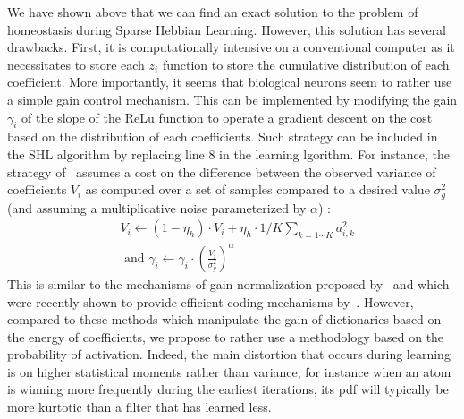 \documentclass[letterpaper,final,conference,10pt]{IEEEtran}
\newcommand{\citep}[1]{\cite{#1}}
\newcommand{\seeFig}[1]{Figure~\ref{fig:#1}}%
\begin{document}
We have shown above that we can find an exact solution to the problem of homeostasis during Sparse Hebbian Learning. However, this solution has several drawbacks. First, it is computationally intensive on a conventional computer as it necessitates to store each $z_i$ function to store the cumulative distribution of each coefficient. More importantly, it seems that biological neurons seem to rather use a simple gain control mechanism. This can be implemented by modifying the gain $\gamma_i$ of the slope of the ReLu function to operate a gradient descent on the cost based on the distribution of each coefficients. Such strategy can be included in the SHL algorithm by replacing line 8 in the learning lgorithm. For instance, the strategy of~\citep{Olshausen97} assumes a cost on the difference between the observed variance of coefficients $V_i$ as computed over a set of samples compared to a desired value $\sigma_g^2$ (and assuming a multiplicative noise parameterized by $\alpha$) :
\begin{align}
&V_i \leftarrow (1- \eta_h ) \cdot V_i + \eta_h \cdot 1/K\sum_{k=1\cdots K} a_{i, k}^2 \\ &\textrm{ and }
\gamma_i \leftarrow \gamma_i \cdot \left( \frac{V_i}{\sigma_g^2} \right)^\alpha
\end{align}%
This is similar to the mechanisms of gain normalization proposed by~\cite{Schwartz01} and which were recently shown to provide efficient coding mechanisms by~\cite{Simoncelli01}. However, compared to these methods which manipulate the gain of dictionaries based on the energy of coefficients, we propose to rather use a methodology based on the probability of activation. Indeed, the main distortion that occurs during learning is on higher statistical moments rather than variance, for instance when an atom is winning more frequently during the earliest iterations, its pdf will typically be more kurtotic than a filter that has learned less.
\end{document}
